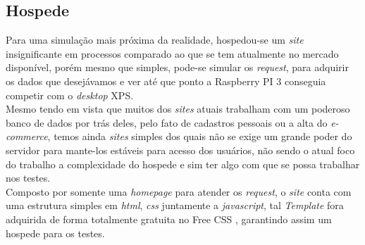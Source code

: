 \documentclass[12pt]{article}
\begin{document}
    


  
  \subsection{Hospede} \label{sec:site}
    Para uma simulação mais próxima da realidade, hospedou-se um \textit{site} insignificante em processos comparado ao que se tem atualmente no mercado disponível, porém mesmo que simples, pode-se simular os \textit{request}, para adquirir os dados que desejávamos e ver até que ponto a Raspberry PI 3 conseguia competir com o \textit{desktop} XPS.\\
    Mesmo tendo em vista que muitos dos \textit{sites} atuais trabalham com um poderoso banco de dados por trás deles, pelo fato de cadastros pessoais ou a alta do \textit{e-commerce}, temos ainda \textit{sites} simples dos quais não se exige um grande poder do servidor para mante-los estáveis para acesso dos usuários, não sendo o atual foco do trabalho a complexidade do hospede e sim ter algo com que se possa trabalhar nos testes.\\
    Composto por somente uma \textit{homepage} para atender os \textit{request}, o \textit{site} conta com uma estrutura simples em \textit{html}, \textit{css} juntamente a \textit{javascript}, tal \textit{Template} fora adquirida de forma totalmente gratuita no Free CSS \cite{sitesFree}, garantindo assim um hospede para os testes.
\end{document}
